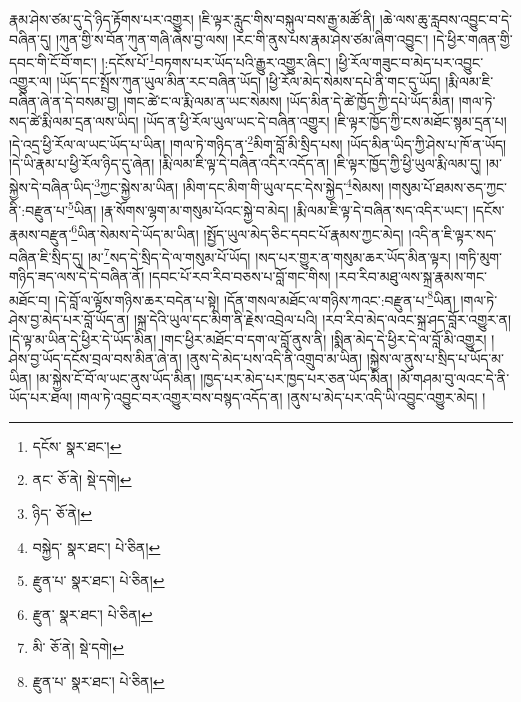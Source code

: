 རྣམ་ཤེས་ཙམ་དུ་དེ་ཉིད་རྟོགས་པར་འགྱུར། །ཇི་ལྟར་རླུང་གིས་བསྐུལ་བས་རྒྱ་མཚོ་ནི། །ཆེ་ལས་ཆུ་རླབས་འབྱུང་བ་དེ་བཞིན་དུ། །ཀུན་གྱི་ས་བོན་ཀུན་གཞི་ཞེས་བྱ་ལས། །རང་གི་ནུས་པས་རྣམ་ཤེས་ཙམ་ཞིག་འབྱུང་། །དེ་ཕྱིར་གཞན་གྱི་དབང་གི་ངོ་བོ་གང་། །:དངོས་པོ་\footnote{དངོས་  སྣར་ཐང་། }བཏགས་པར་ཡོད་པའི་རྒྱུར་འགྱུར་ཞིང་། །ཕྱི་རོལ་གཟུང་བ་མེད་པར་འབྱུང་འགྱུར་ལ། །ཡོད་དང་སྤྲོས་ཀུན་ཡུལ་མིན་རང་བཞིན་ཡོད། །ཕྱི་རོལ་མེད་སེམས་དཔེ་ནི་གང་དུ་ཡོད། །རྨི་ལམ་ཇི་བཞིན་ཞེ་ན་དེ་བསམ་བྱ། །གང་ཚེ་ང་ལ་རྨི་ལམ་ན་ཡང་སེམས། །ཡོད་མིན་དེ་ཚེ་ཁྱོད་ཀྱི་དཔེ་ཡོད་མིན། །གལ་ཏེ་སད་ཚེ་རྨི་ལམ་དྲན་ལས་ཡིད། །ཡོད་ན་ཕྱི་རོལ་ཡུལ་ཡང་དེ་བཞིན་འགྱུར། །ཇི་ལྟར་ཁྱོད་ཀྱི་ངས་མཐོང་སྙམ་དྲན་པ། །དེ་འདྲ་ཕྱི་རོལ་ལ་ཡང་ཡོད་པ་ཡིན། །གལ་ཏེ་གཉིད་ན་\footnote{ནང་  ཅོ་ནེ།  སྡེ་དགེ། }མིག་བློ་མི་སྲིད་པས། །ཡོད་མིན་ཡིད་ཀྱི་ཤེས་པ་ཁོ་ན་ཡོད། །དེ་ཡི་རྣམ་པ་ཕྱི་རོལ་ཉིད་དུ་ཞེན། །རྨི་ལམ་ཇི་ལྟ་དེ་བཞིན་འདིར་འདོད་ན། །ཇི་ལྟར་ཁྱོད་ཀྱི་ཕྱི་ཡུལ་རྨི་ལམ་དུ། །མ་སྐྱེས་དེ་བཞིན་ཡིད་\footnote{ཉིད་  ཅོ་ནེ། }ཀྱང་སྐྱེས་མ་ཡིན། །མིག་དང་མིག་གི་ཡུལ་དང་དེས་སྐྱེད་\footnote{བསྐྱེད་  སྣར་ཐང་།  པེ་ཅིན། }སེམས། །གསུམ་པོ་ཐམས་ཅད་ཀྱང་ནི་:བརྫུན་པ་\footnote{རྫུན་པ་  སྣར་ཐང་།  པེ་ཅིན། }ཡིན། །རྣ་སོགས་ལྷག་མ་གསུམ་པོའང་སྐྱེ་བ་མེད། །རྨི་ལམ་ཇི་ལྟ་དེ་བཞིན་སད་འདིར་ཡང་། །དངོས་རྣམས་བརྫུན་\footnote{རྫུན་  སྣར་ཐང་།  པེ་ཅིན། }ཡིན་སེམས་དེ་ཡོད་མ་ཡིན། །སྤྱོད་ཡུལ་མེད་ཅིང་དབང་པོ་རྣམས་ཀྱང་མེད། །འདི་ན་ཇི་ལྟར་སད་བཞིན་ཇི་སྲིད་དུ། །མ་\footnote{མི་  ཅོ་ནེ།  སྡེ་དགེ། }སད་དེ་སྲིད་དེ་ལ་གསུམ་པོ་ཡོད། །སད་པར་གྱུར་ན་གསུམ་ཆར་ཡོད་མིན་ལྟར། །གཏི་མུག་གཉིད་ཟད་ལས་དེ་དེ་བཞིན་ནོ། །དབང་པོ་རབ་རིབ་བཅས་པ་བློ་གང་གིས། །རབ་རིབ་མཐུ་ལས་སྐྲ་རྣམས་གང་མཐོང་བ། །དེ་བློ་ལ་ལྟོས་གཉིས་ཆར་བདེན་པ་སྟེ། །དོན་གསལ་མཐོང་ལ་གཉིས་ཀའང་:བརྫུན་པ་\footnote{རྫུན་པ་  སྣར་ཐང་།  པེ་ཅིན། }ཡིན། །གལ་ཏེ་ཤེས་བྱ་མེད་པར་བློ་ཡོད་ན། །སྐྲ་དེའི་ཡུལ་དང་མིག་ནི་རྗེས་འབྲེལ་པའི། །རབ་རིབ་མེད་ལའང་སྐྲ་ཤད་བློར་འགྱུར་ན། །དེ་ལྟ་མ་ཡིན་དེ་ཕྱིར་དེ་ཡོད་མིན། །གང་ཕྱིར་མཐོང་བ་དག་ལ་བློ་ནུས་ནི། །སྨིན་མེད་དེ་ཕྱིར་དེ་ལ་བློ་མི་འགྱུར། །ཤེས་བྱ་ཡོད་དངོས་བྲལ་བས་མིན་ཞེ་ན། །ནུས་དེ་མེད་པས་འདི་ནི་འགྲུབ་མ་ཡིན། །སྐྱེས་ལ་ནུས་པ་སྲིད་པ་ཡོད་མ་ཡིན། །མ་སྐྱེས་ངོ་བོ་ལ་ཡང་ནུས་ཡོད་མིན། །ཁྱད་པར་མེད་པར་ཁྱད་པར་ཅན་ཡོད་མིན། །མོ་གཤམ་བུ་ལའང་དེ་ནི་ཡོད་པར་ཐལ། །གལ་ཏེ་འབྱུང་བར་འགྱུར་བས་བསྙད་འདོད་ན། །ནུས་པ་མེད་པར་འདི་ཡི་འབྱུང་འགྱུར་མེད། །
